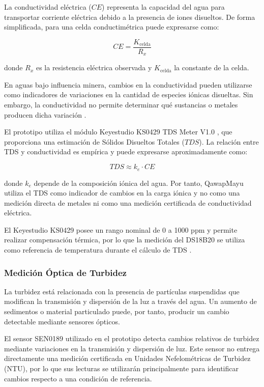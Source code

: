 \documentclass[11pt,a4paper]{article}
\begin{document}
La conductividad eléctrica ($CE$) representa la capacidad del agua para transportar corriente eléctrica debido a la presencia de iones disueltos. De forma simplificada, para una celda conductimétrica puede expresarse como:

\begin{equation}
    CE = \frac{K_{\text{celda}}}{R_x}
\end{equation}

donde $R_x$ es la resistencia eléctrica observada y $K_{\text{celda}}$ la constante de la celda.

En aguas bajo influencia minera, cambios en la conductividad pueden utilizarse como indicadores de variaciones en la cantidad de especies iónicas disueltas. Sin embargo, la conductividad no permite determinar qué sustancias o metales producen dicha variación \cite{usgsMineDrainage}.

El prototipo utiliza el módulo Keyestudio KS0429 TDS Meter V1.0 \cite{tds}, que proporciona una estimación de Sólidos Disueltos Totales ($TDS$). La relación entre TDS y conductividad es empírica y puede expresarse aproximadamente como:

\begin{equation}
    TDS \approx k_e \cdot CE
\end{equation}

donde $k_e$ depende de la composición iónica del agua. Por tanto, QawapMayu utiliza el TDS como indicador de cambios en la carga iónica y no como una medición directa de metales ni como una medición certificada de conductividad eléctrica.

El Keyestudio KS0429 posee un rango nominal de 0 a 1000 ppm y permite realizar compensación térmica, por lo que la medición del DS18B20 se utiliza como referencia de temperatura durante el cálculo de TDS \cite{tds}.

\subsubsection{Medición Óptica de Turbidez}

La turbidez está relacionada con la presencia de partículas suspendidas que modifican la transmisión y dispersión de la luz a través del agua. Un aumento de sedimentos o material particulado puede, por tanto, producir un cambio detectable mediante sensores ópticos.

El sensor SEN0189 \cite{turb} utilizado en el prototipo detecta cambios relativos de turbidez mediante variaciones en la transmisión y dispersión de luz. Este sensor no entrega directamente una medición certificada en Unidades Nefelométricas de Turbidez (NTU), por lo que sus lecturas se utilizarán principalmente para identificar cambios respecto a una condición de referencia.
\end{document}

